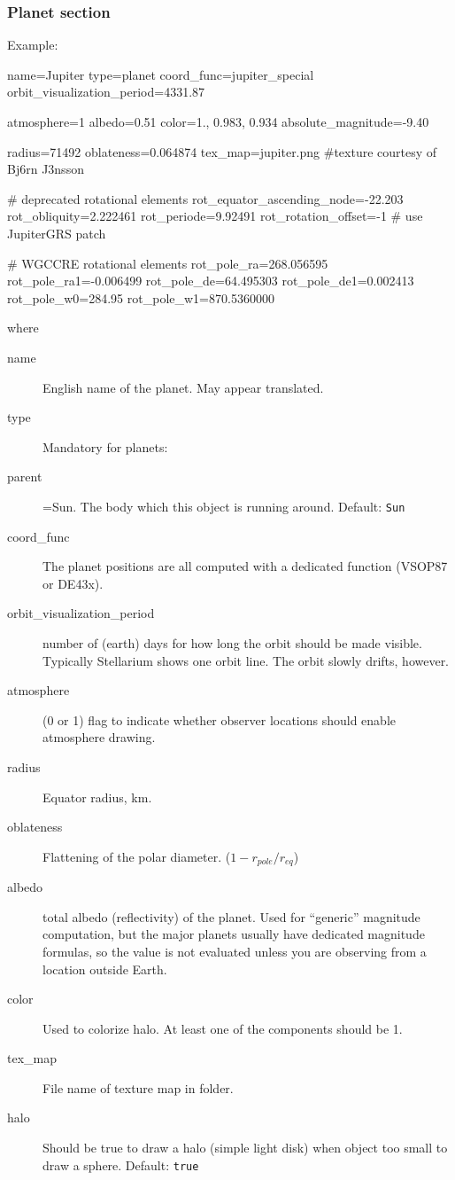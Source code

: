 \subsubsection{Planet section}
\label{sec:ssystem.ini:Planet}

Example:
\begin{configfile}
[jupiter]
name=Jupiter
type=planet
coord_func=jupiter_special
orbit_visualization_period=4331.87

atmosphere=1
albedo=0.51
color=1., 0.983, 0.934
absolute_magnitude=-9.40

radius=71492
oblateness=0.064874
tex_map=jupiter.png #texture courtesy of Bj\xf6rn J\xf3nsson

# deprecated rotational elements
rot_equator_ascending_node=-22.203
rot_obliquity=2.222461
rot_periode=9.92491
rot_rotation_offset=-1 # use JupiterGRS patch

# WGCCRE rotational elements
rot_pole_ra=268.056595
rot_pole_ra1=-0.006499
rot_pole_de=64.495303
rot_pole_de1=0.002413
rot_pole_w0=284.95
rot_pole_w1=870.5360000

\end{configfile}


where 
\begin{description}
\item[name] English name of the planet. May appear translated. 
\item[type] Mandatory for planets: \value{planet}
\item[parent]=Sun. The body which this object is running around. Default: \texttt{Sun}
\item[coord\_func] The planet positions are all computed with a dedicated function (VSOP87 or DE43x). 
\item[orbit\_visualization\_period] number of (earth) days for how
  long the orbit should be made visible. Typically Stellarium shows
  one orbit line. The orbit slowly drifts, however.

\item[atmosphere] (0 or 1) flag to indicate whether observer locations should enable atmosphere drawing.

\item[radius] Equator radius, km.
\item[oblateness] Flattening of the polar diameter. ($1-r_{pole}/r_{eq}$)
\item[albedo] total albedo (reflectivity) of the planet. Used for ``generic''
  magnitude computation, but the major planets usually have dedicated
  magnitude formulas, so the value is not evaluated unless you are
  observing from a location outside Earth.
\item[color] Used to colorize halo. At least one of the components should be 1.
\item[tex\_map] File name of texture map in  folder.
\item[halo] Should be true to draw a halo (simple light disk) when object too small to draw a sphere. Default: \texttt{true}
\end{description}

